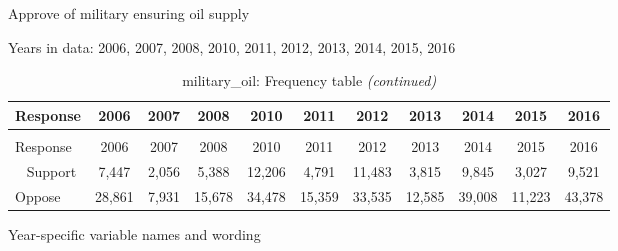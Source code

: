 \documentclass[12pt]{article}
\begin{document}
Approve of military ensuring oil supply

Years in data: 2006, 2007, 2008, 2010, 2011, 2012, 2013, 2014, 2015,
2016\begingroup\fontsize{10}{12}\selectfont

\begin{longtable}[t]{lcccccccccc}
\caption{\label{tab:unnamed-chunk-4}military\_oil: Frequency table}\\
\toprule
Response & 2006 & 2007 & 2008 & 2010 & 2011 & 2012 & 2013 & 2014 & 2015 & 2016\\
\midrule
\endfirsthead
\caption[]{military\_oil: Frequency table \textit{(continued)}}\\
\toprule
Response & 2006 & 2007 & 2008 & 2010 & 2011 & 2012 & 2013 & 2014 & 2015 & 2016\\
\midrule
\endhead
\
\endfoot
\bottomrule
\endlastfoot
Support & 7,447 & 2,056 & 5,388 & 12,206 & 4,791 & 11,483 & 3,815 & 9,845 & 3,027 & 9,521\\
Oppose & 28,861 & 7,931 & 15,678 & 34,478 & 15,359 & 33,535 & 12,585 & 39,008 & 11,223 & 43,378\\*
\end{longtable}

\endgroup{}

Year-specific variable names and wording
\end{document}
